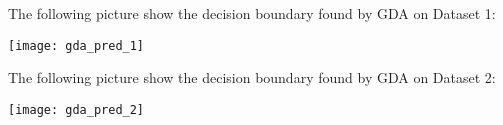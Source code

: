 \begin{answer}
\graphicspath{ {./linearclass/} }
	The following picture show the decision boundary found by GDA on Dataset 1:
	
	
\texttt{[image: gda\_pred\_1]}

	The following picture show the decision boundary found by GDA on Dataset 2:
	
	
\texttt{[image: gda\_pred\_2]}


\end{answer}
